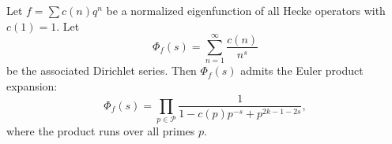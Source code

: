 Let $f = \sum c(n)q^n$ be a normalized eigenfunction of all Hecke operators with $c(1) = 1$. Let
$$\Phi_f(s) = \sum_{n=1}^{\infty} \frac{c(n)}{n^s}$$
be the associated Dirichlet series. Then $\Phi_f(s)$ admits the Euler product expansion:
$$\Phi_f(s) = \prod_{p \in \mathcal{P}} \frac{1}{1 - c(p)p^{-s} + p^{2k-1-2s}},$$
where the product runs over all primes $p$.
